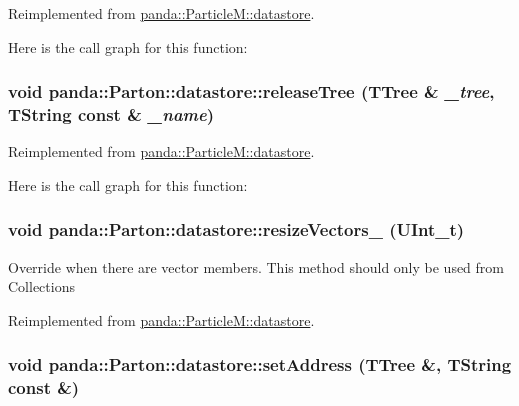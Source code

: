 Reimplemented from \hyperlink{structpanda_1_1ParticleM_1_1datastore_a4069b8cdca5715ed6faf0a7907ea8386}{panda::ParticleM::datastore}.

Here is the call graph for this function:\hypertarget{structpanda_1_1Parton_1_1datastore_affc6fef2d7648b73182dbb91d5043b36}{
\subsubsection[{releaseTree}]{\setlength{\rightskip}{0pt plus 5cm}void panda::Parton::datastore::releaseTree (TTree \& {\em \_\-tree}, \/  TString const \& {\em \_\-name})}}
\label{structpanda_1_1Parton_1_1datastore_affc6fef2d7648b73182dbb91d5043b36}


Reimplemented from \hyperlink{structpanda_1_1ParticleM_1_1datastore_ad6986990fa55f1c6ca4e92db28486922}{panda::ParticleM::datastore}.

Here is the call graph for this function:\hypertarget{structpanda_1_1Parton_1_1datastore_a85ed8f023c9fddb6ada93150e4d03c22}{
\subsubsection[{resizeVectors\_\-}]{\setlength{\rightskip}{0pt plus 5cm}void panda::Parton::datastore::resizeVectors\_\- (UInt\_\-t)}}
\label{structpanda_1_1Parton_1_1datastore_a85ed8f023c9fddb6ada93150e4d03c22}


Override when there are vector members. This method should only be used from Collections 

Reimplemented from \hyperlink{structpanda_1_1ParticleM_1_1datastore_a6dd61d4a8f70e81a1638757a5edbc7ed}{panda::ParticleM::datastore}.\hypertarget{structpanda_1_1Parton_1_1datastore_a2348c36dbc9d5f769fac19fcb9582e5a}{
\subsubsection[{setAddress}]{\setlength{\rightskip}{0pt plus 5cm}void panda::Parton::datastore::setAddress (TTree \&, \/  TString const \&)}}
\label{structpanda_1_1Parton_1_1datastore_a2348c36dbc9d5f769fac19fcb9582e5a}


